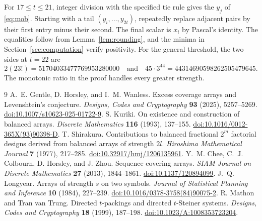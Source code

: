 \documentclass[11pt]{article}
\begin{document}
For \(17\le t\le21\), integer division with the specified tie rule
gives the \(y_j\) of \eqref{eq:mob}. Starting with a tail
\((y_i,\ldots,y_{2t})\), repeatedly replace adjacent pairs by
their first entry minus their second. The final scalar is \(x_i\)
by Pascal's identity. The equalities follow from
Lemma~\ref{lem:rounding}, and the minima in
Section~\ref{sec:computation} verify positivity.
For the general threshold, the two sides at \(t=22\) are
\[
2(23!)=51704033477769953280000
\quad\text{and}\quad
45\cdot3^{44}=44314690598262505479645.
\]
The monotonic ratio in the proof handles every greater strength.

\begin{thebibliography}{9}
A.~E. Gentle, D. Horsley, and I.~M. Wanless.
Excess coverage arrays and Levenshtein's conjecture.
\emph{Designs, Codes and Cryptography} \textbf{93} (2025), 5257--5269.
\href{https://doi.org/10.1007/s10623-025-01722-9}{doi:10.1007/s10623-025-01722-9}.
S. Kuriki. On existence and construction of balanced arrays.
\emph{Discrete Mathematics} \textbf{116} (1993), 137--155.
\href{https://doi.org/10.1016/0012-365X(93)90398-D}{doi:10.1016/0012-365X(93)90398-D}.
T. Shirakura. Contributions to balanced fractional $2^m$ factorial designs
derived from balanced arrays of strength $2l$.
\emph{Hiroshima Mathematical Journal} \textbf{7} (1977), 217--285.
\href{https://doi.org/10.32917/hmj/1206135961}{doi:10.32917/hmj/1206135961}.
Y.~M. Chee, C.~J. Colbourn, D. Horsley, and J. Zhou.
Sequence covering arrays.
\emph{SIAM Journal on Discrete Mathematics} \textbf{27} (2013), 1844--1861.
\href{https://doi.org/10.1137/120894099}{doi:10.1137/120894099}.
J.~Q. Longyear. Arrays of strength \(s\) on two symbols.
\emph{Journal of Statistical Planning and Inference} \textbf{10} (1984), 227--239.
\href{https://doi.org/10.1016/0378-3758(84)90075-2}{doi:10.1016/0378-3758(84)90075-2}.
R. Mathon and Tran van Trung.
Directed \(t\)-packings and directed \(t\)-Steiner systems.
\emph{Designs, Codes and Cryptography} \textbf{18} (1999), 187--198.
\href{https://doi.org/10.1023/A:1008353723204}{doi:10.1023/A:1008353723204}.
\end{thebibliography}
\end{document}
